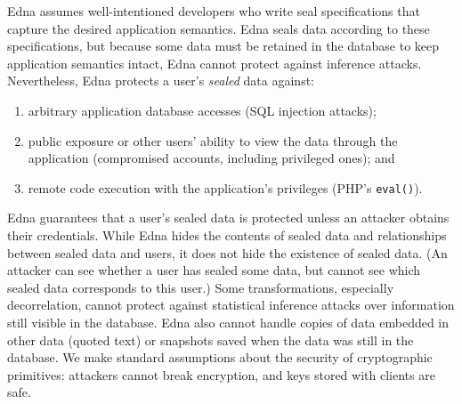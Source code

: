 \label{s:threat}
%
Edna assumes well-intentioned developers who write seal specifications
that capture the desired application semantics.
%
Edna seals data according to these specifications, but because some data
must be retained in the database to keep application semantics intact,
Edna cannot protect against inference attacks.
%
Nevertheless, Edna protects a user's \emph{sealed} data against:
%
\begin{enumerate}[nosep]
  \item arbitrary application database accesses (\eg SQL
    injection attacks);
  \item public exposure or other users' ability to view the data through
    the application (\eg compromised accounts, including privileged ones); and
  \item remote code execution with the application's privileges
    (\eg PHP's \texttt{eval()}).
\end{enumerate}
%
Edna guarantees that a user's sealed data is protected unless an attacker
obtains their credentials.
%
While Edna hides the contents of sealed data and relationships between sealed
data and users, it does not hide the existence of sealed data. (An attacker
can see whether a user has sealed some data, but cannot see which sealed data
corresponds to this user.)
%
Some transformations, especially decorrelation, cannot protect against
statistical inference attacks over information still visible in the database.
%
Edna also cannot handle copies of data embedded in other data (\eg quoted
text) or snapshots saved when the data was still in the database.
%
We make standard assumptions about the security of cryptographic primitives:
attackers cannot break encryption, and keys stored with clients are safe.
%
